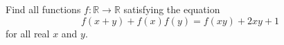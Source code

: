 Find all functions $f : \mathbb{R} \to \mathbb{R}$ satisfying the equation
\[ f(x + y) + f(x)f(y) = f(xy) + 2xy + 1 \]
for all real $x$ and $y$.
